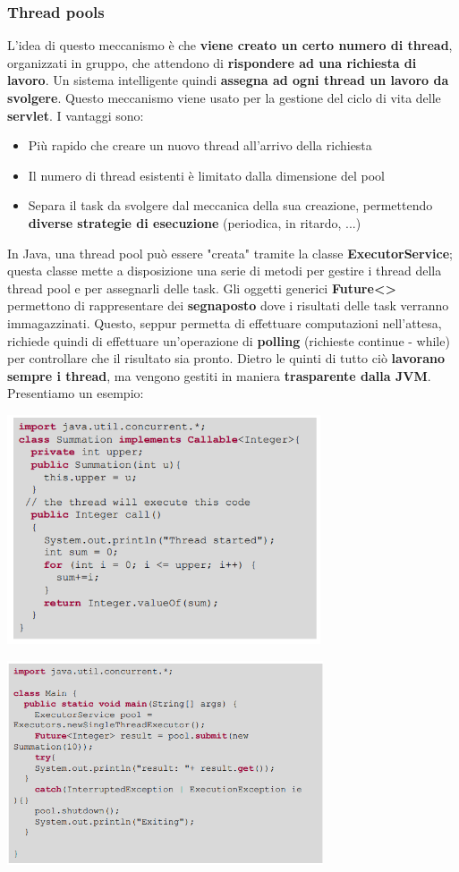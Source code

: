 \documentclass[12pt]{article}
\begin{document}
\subsubsection{Thread pools}
L'idea di questo meccanismo è che \textbf{viene creato un certo numero di thread}, organizzati in gruppo, che attendono di \textbf{rispondere ad una richiesta di lavoro}. Un sistema intelligente quindi \textbf{assegna ad ogni thread un lavoro da svolgere}. Questo meccanismo viene usato per la gestione del ciclo di vita delle \textbf{servlet}. I vantaggi sono:
\begin{itemize}
    \item Più rapido che creare un nuovo thread all'arrivo della richiesta
    \item Il numero di thread esistenti è limitato dalla dimensione del pool
    \item Separa il task da svolgere dal meccanica della sua creazione, permettendo \textbf{diverse strategie di esecuzione} (periodica, in ritardo, ...)
\end{itemize}
In Java, una thread pool può essere "creata" tramite la classe \textbf{ExecutorService}; questa classe mette a disposizione una serie di metodi per gestire i thread della thread pool e per assegnarli delle task. Gli oggetti generici \textbf{Future<>} permettono di rappresentare dei \textbf{segnaposto} dove i risultati delle task verranno immagazzinati. Questo, seppur permetta di effettuare computazioni nell'attesa, richiede quindi di effettuare un'operazione di \textbf{polling} (richieste continue - while) per controllare che il risultato sia pronto. Dietro le quinti di tutto ciò \textbf{lavorano sempre i thread}, ma vengono gestiti in maniera \textbf{trasparente dalla JVM}.
Presentiamo un esempio:
\begin{center}
    \includegraphics[width =9.25cm]{Images/75.PNG}
\end{center}
\begin{center}
    \includegraphics[width = 0.70\textwidth]{Images/76.PNG}
\end{center}
\end{document}
